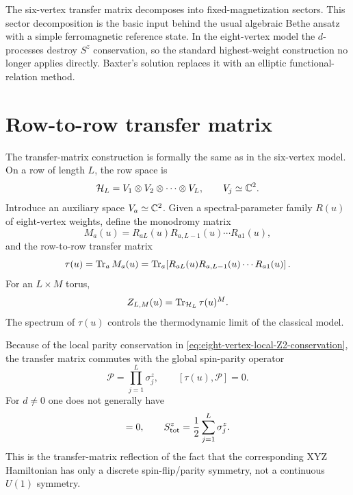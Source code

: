 \begin{remark}
The six-vertex transfer matrix decomposes into fixed-magnetization sectors.  This
sector decomposition is the basic input behind the usual algebraic Bethe ansatz
with a simple ferromagnetic reference state.  In the eight-vertex model the
$d$-processes destroy $S^z$ conservation, so the standard highest-weight
construction no longer applies directly.  Baxter's solution replaces it with an
elliptic functional-relation method.
\end{remark}

\section{Row-to-row transfer matrix}
\label{sec:eight-vertex-transfer-matrix}

The transfer-matrix construction is formally the same as in the six-vertex
model.  On a row of length $L$, the row space is
\begin{equation}
\label{eq:eight-vertex-row-space}
    \mathcal{H}_L=V_1\otimes V_2\otimes\cdots\otimes V_L,
    \qquad V_j\simeq\mathbb{C}^2 .
\end{equation}
Introduce an auxiliary space $V_a\simeq\mathbb{C}^2$.  Given a spectral-parameter family
$R(u)$ of eight-vertex weights, define the monodromy matrix
\begin{equation}
\label{eq:eight-vertex-monodromy}
    M_a(u)=R_{aL}(u)R_{a,L-1}(u)\cdots R_{a1}(u),
\end{equation}
and the row-to-row transfer matrix
\begin{equation}
\label{eq:eight-vertex-transfer-matrix}
    \tau(u)=\operatorname{Tr}_a M_a(u)
    =\operatorname{Tr}_a\!\left[R_{aL}(u)R_{a,L-1}(u)\cdots R_{a1}(u)\right] .
\end{equation}
For an $L\times M$ torus,
\begin{equation}
\label{eq:eight-vertex-partition-function}
    Z_{L,M}(u)=\operatorname{Tr}_{\mathcal{H}_L}\tau(u)^M .
\end{equation}
The spectrum of $\tau(u)$ controls the thermodynamic limit of the classical
model.

Because of the local parity conservation in
\cref{eq:eight-vertex-local-Z2-conservation}, the transfer matrix commutes with
the global spin-parity operator
\begin{equation}
\label{eq:eight-vertex-global-parity}
    \mathcal{P}=\prod_{j=1}^{L}\sigma_j^z,
    \qquad
    [\tau(u),\mathcal{P}]=0 .
\end{equation}
For $d\neq0$ one does not generally have
\begin{equation}
    [\tau(u),S^z_{\rm tot}]=0,
    \qquad
    S^z_{\rm tot}=\frac12\sum_{j=1}^{L}\sigma_j^z .
\end{equation}
This is the transfer-matrix reflection of the fact that the corresponding XYZ
Hamiltonian has only a discrete spin-flip/parity symmetry, not a continuous
$U(1)$ symmetry.

